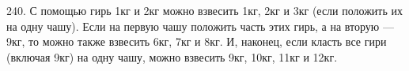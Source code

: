 240. С помощью гирь 1кг и 2кг можно взвесить 1кг, 2кг и 3кг (если положить их на одну чашу). Если на первую чашу положить часть этих гирь, а на вторую --- 9кг, то можно также взвесить 6кг, 7кг и 8кг. И, наконец, если класть все гири (включая 9кг) на одну чашу, можно взвесить 9кг, 10кг, 11кг и 12кг.\\
